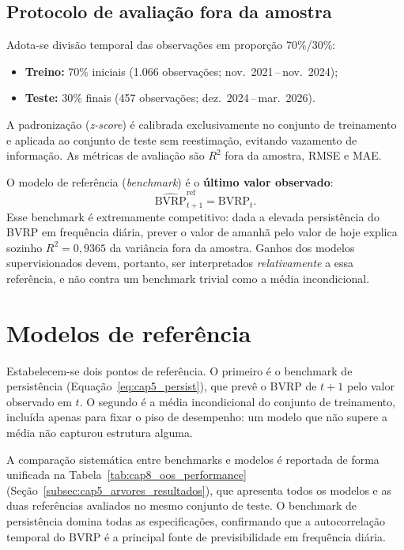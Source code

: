 \subsection{Protocolo de avaliação fora da amostra}
\label{subsec:cap5_protocolo}

Adota-se divisão temporal das observações em proporção 70\%/30\%:

\begin{itemize}
    \item \textbf{Treino:} 70\% iniciais (1.066 observações; nov.~2021\,–\,nov.~2024);
    \item \textbf{Teste:} 30\% finais (457 observações; dez.~2024\,–\,mar.~2026).
\end{itemize}

A padronização (\textit{z-score}) é calibrada exclusivamente no conjunto de
treinamento e aplicada ao conjunto de teste sem reestimação, evitando vazamento
de informação. As métricas de avaliação são $R^2$ fora da amostra, RMSE e MAE.

O modelo de referência (\textit{benchmark}) é o \textbf{último valor observado}:
\begin{equation}
\widehat{\text{BVRP}}_{t+1}^{\text{ref}} = \text{BVRP}_t.
\label{eq:cap5_persist}
\end{equation}
Esse benchmark é extremamente competitivo: dada a elevada persistência do BVRP em
frequência diária, prever o valor de amanhã pelo valor de hoje explica sozinho
$R^2 = 0{,}9365$ da variância fora da amostra. Ganhos dos modelos supervisionados
devem, portanto, ser interpretados \textit{relativamente} a essa referência, e não
contra um benchmark trivial como a média incondicional.

\section{Modelos de referência}
\label{sec:cap5_benchmarks}

Estabelecem-se dois pontos de referência. O primeiro é o benchmark de
persistência (Equação~\ref{eq:cap5_persist}), que prevê o BVRP de $t+1$ pelo valor
observado em $t$. O segundo é a média incondicional do conjunto de treinamento,
incluída apenas para fixar o piso de desempenho: um modelo que não supere a média
não capturou estrutura alguma.

A comparação sistemática entre benchmarks e modelos é reportada de forma unificada
na Tabela~\ref{tab:cap8_oos_performance} (Seção~\ref{subsec:cap5_arvores_resultados}),
que apresenta todos os modelos e as duas referências avaliados no mesmo conjunto de
teste. O benchmark de persistência domina todas as especificações, confirmando que a
autocorrelação temporal do BVRP é a principal fonte de previsibilidade em frequência
diária.

